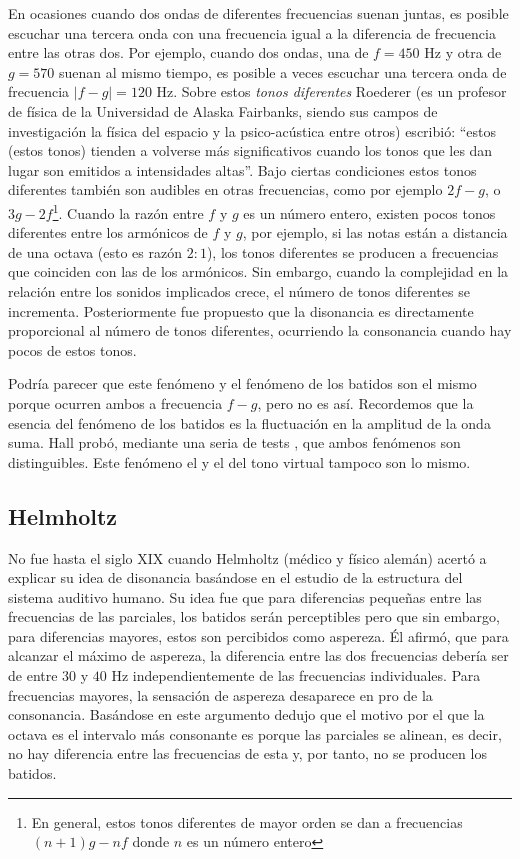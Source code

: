 \documentclass[11pt,a4paper]{article}
\begin{document}
	En ocasiones cuando dos ondas de diferentes frecuencias suenan juntas, es posible escuchar una tercera onda con una frecuencia igual a la diferencia de frecuencia entre las otras dos. Por ejemplo, cuando dos ondas, una de $f = 450$ Hz y otra de $g =570$ suenan al mismo tiempo, es posible a veces escuchar una tercera onda de frecuencia $ | f - g | = 120$ Hz. Sobre estos \emph{tonos diferentes} Roederer (es un profesor de física de la Universidad de Alaska Fairbanks, siendo sus campos de investigación la física del espacio y la psico-acústica entre otros)  escribió: ``estos (estos tonos) tienden a volverse más significativos cuando los tonos que les dan lugar son emitidos a intensidades altas''. Bajo ciertas condiciones estos tonos diferentes también son audibles en otras frecuencias, como por ejemplo $2f-g$,  o $3g-2f$\footnote{En general, estos tonos diferentes de mayor orden se dan a frecuencias $(n+1)g - nf$ donde $n$ es un número entero}. Cuando la razón entre $f$ y $g$ es un número entero, existen pocos tonos diferentes entre los armónicos de $f$ y $g$, por ejemplo, si las notas están a distancia de una octava (esto es razón $2:1$), los tonos diferentes se producen a frecuencias que coinciden con las de los armónicos. Sin embargo, cuando la complejidad en la relación entre los sonidos implicados crece, el número de tonos diferentes se incrementa. Posteriormente fue propuesto que la disonancia es directamente proporcional al número de tonos diferentes, ocurriendo la consonancia cuando hay pocos de estos tonos.
	
	Podría parecer que este fenómeno y el fenómeno de los batidos son el mismo porque ocurren ambos a frecuencia $f-g$, pero no es así. Recordemos que la esencia del fenómeno de los batidos es la fluctuación en la amplitud de la onda suma. Hall probó, mediante una seria de tests \cite{H}, que ambos fenómenos son distinguibles. Este fenómeno el y el del tono virtual tampoco son lo mismo.
	
	
	\subsection{Helmholtz}
	
	No fue hasta el siglo XIX cuando Helmholtz (médico y físico alemán) acertó a explicar su idea de disonancia basándose en el estudio de la estructura del sistema auditivo humano. Su idea fue que para diferencias pequeñas entre las frecuencias de las parciales, los batidos serán perceptibles pero que sin embargo, para diferencias mayores, estos son percibidos como aspereza. Él afirmó, que para alcanzar el máximo de aspereza, la diferencia entre las dos frecuencias debería ser de entre $30$ y $40$ Hz independientemente de las frecuencias individuales. Para frecuencias mayores, la sensación de aspereza desaparece en pro de la consonancia. Basándose en este argumento dedujo que el motivo por el que la octava es el intervalo más consonante es porque las parciales se alinean, es decir, no hay diferencia entre las frecuencias de esta y, por tanto, no se producen los batidos.
	
\end{document}
